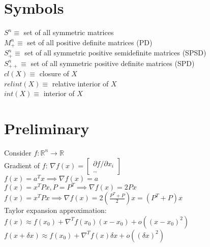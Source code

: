 \documentclass[8pt]{report}
\newcommand{\R}{\mathbb{R}}
\begin{document}

\begin{multicols*}{2}

  \section{Symbols}

  $S^n \equiv$ set of all symmetric matrices\\
  
  $M_+^n \equiv$ set of all positive definite matrices (PD)\\
  
  $S_+^n \equiv$ set of all symmetric positive semidefinite matrices (SPSD)\\
  
  $S_{++}^n \equiv$ set of all symmetric positive definite matrices (SPD)\\
  
  $cl(X) \equiv$ closure of $X$\\

  $relint(X) \equiv$ relative interior of $X$\\
  
  $int(X) \equiv$ interior of $X$\\
  
  \vfill\null
  \columnbreak
  \vfill\null
  \columnbreak
  
  \section{Preliminary}
  
  Consider $f:\R^n \to \R$\\
  Gradient of $f$: $\nabla f(x) = \begin{bmatrix} \partial f / \partial x_i \\ .. \end{bmatrix}$\\
  $f(x) = a^Tx \implies \nabla f(x) = a$\\
  $f(x) = x^TPx, P=P^T \implies \nabla f(x) = 2Px$\\
  $f(x) = x^TPx \implies \nabla f(x) = 2(\frac{P^T+P}{2})x=(P^T+P)x$\\

  Taylor expansion approximation:\\
  $f(x) \approx f(x_0) + \nabla^T f(x_0)(x-x_0) + o((x-x_0)^2)$\\
  $f(x+\delta x) \approx f(x_0) + \nabla^T f(x)\delta x + o((\delta x)^2)$\\
  

\end{multicols*}
\end{document}
